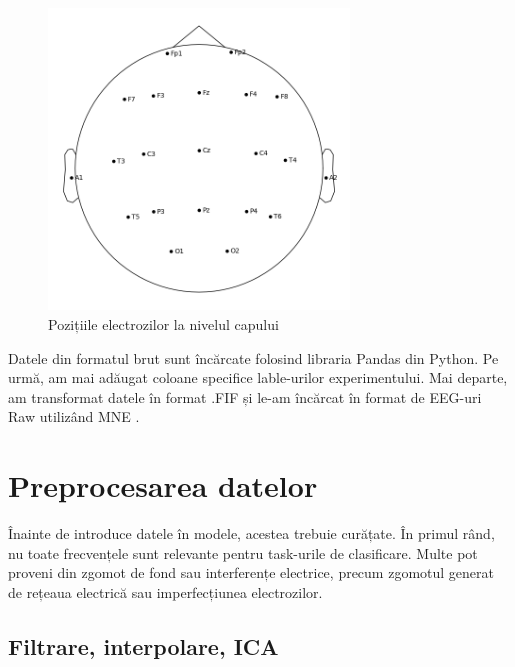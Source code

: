\setlength{\abovecaptionskip}{0pt}
\setlength{\belowcaptionskip}{0pt}
\clearpage
\begin{figure}[h]
    \centering
    \includegraphics[width=8cm]{images/Sensor_positions_(eeg).png}
    \caption{Pozițiile electrozilor la nivelul capului}
    \label{fig:sensor_positions}
\end{figure}
Datele din formatul brut sunt încărcate folosind libraria Pandas \cite{reback2020pandas} din Python. Pe urmă, am mai adăugat coloane specifice lable-urilor experimentului. Mai departe, am transformat datele în format .FIF și le-am încărcat în format de EEG-uri Raw utilizând MNE \cite{MNE}.

\section{Preprocesarea datelor}
Înainte de introduce datele în modele, acestea trebuie curățate. În primul rând, nu toate frecvențele sunt relevante pentru task-urile de clasificare. Multe pot proveni din zgomot de fond sau interferențe electrice, precum zgomotul generat de rețeaua electrică sau imperfecțiunea electrozilor. 




\subsection{Filtrare, interpolare, ICA}

